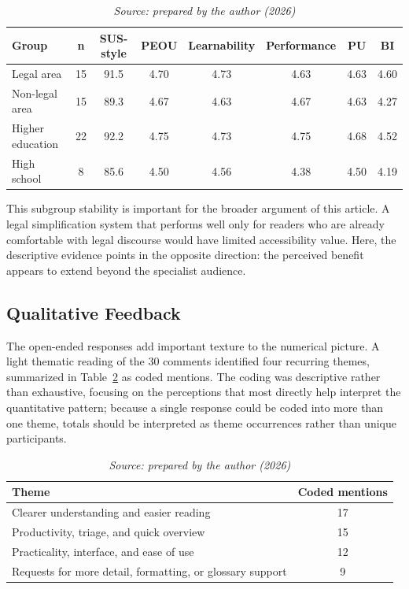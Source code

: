\documentclass[english]{UNISINOSartigo} %
\newcommand{\floatsource}[1]{\caption*{\footnotesize\textit{Source: #1}}}
\newcommand{\tablesource}[1]{\floatsource{#1}}
\begin{document}
\begin{table}[H]\centering
\caption{Subgroup results for the SUS-style composite and construct means.}
\label{tab:subgroups}
\footnotesize
\setlength{\tabcolsep}{4pt}
\renewcommand{\arraystretch}{1.12}
\begin{tabular}{@{}lccccccc@{}}
\toprule
\textbf{Group} & \textbf{n} & \textbf{SUS-style} & \textbf{PEOU} & \textbf{Learnability} & \textbf{Performance} & \textbf{PU} & \textbf{BI} \\
\midrule
Legal area & 15 & 91.5 & 4.70 & 4.73 & 4.63 & 4.63 & 4.60 \\
Non-legal area & 15 & 89.3 & 4.67 & 4.63 & 4.67 & 4.63 & 4.27 \\
Higher education & 22 & 92.2 & 4.75 & 4.73 & 4.75 & 4.68 & 4.52 \\
High school & 8 & 85.6 & 4.50 & 4.56 & 4.38 & 4.50 & 4.19 \\
\bottomrule
\end{tabular}
\tablesource{prepared by the author (2026)}
\end{table}

This subgroup stability is important for the broader argument of this article. A legal simplification system that performs well only for readers who are already comfortable with legal discourse would have limited accessibility value. Here, the descriptive evidence points in the opposite direction: the perceived benefit appears to extend beyond the specialist audience.

\subsection{Qualitative Feedback}

The open-ended responses add important texture to the numerical picture. A light thematic reading of the 30 comments identified four recurring themes, summarized in Table~\ref{tab:theme-frequency} as coded mentions. The coding was descriptive rather than exhaustive, focusing on the perceptions that most directly help interpret the quantitative pattern; because a single response could be coded into more than one theme, totals should be interpreted as theme occurrences rather than unique participants.

\begin{table}[H]\centering
\caption{Frequency of coded mentions in open-ended feedback.}
\label{tab:theme-frequency}
\footnotesize
\setlength{\tabcolsep}{3pt}
\renewcommand{\arraystretch}{1.08}
\begin{tabularx}{\textwidth}{@{}>{\raggedright\arraybackslash}X c@{}}
\toprule
\textbf{Theme} & \textbf{Coded mentions} \\
\midrule
Clearer understanding and easier reading & 17 \\
Productivity, triage, and quick overview & 15 \\
Practicality, interface, and ease of use & 12 \\
Requests for more detail, formatting, or glossary support & 9 \\
\bottomrule
\end{tabularx}
\tablesource{prepared by the author (2026)}
\end{table}
\end{document}
